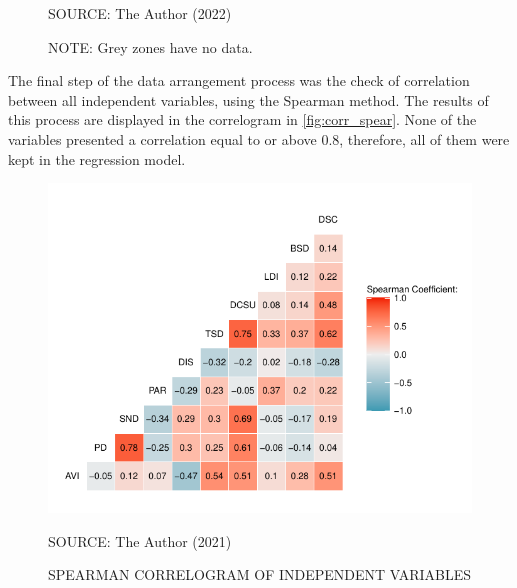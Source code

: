 \begin{figure}[!htbp]
\begin{subfigure}{0.5\textwidth}
    \end{subfigure}    
    \label{fig:taz_sp}
    \par SOURCE: The Author (2022)
    \par NOTE: Grey zones have no data.
\end{figure}


The final step of the data arrangement process was the check of correlation between all independent variables, using the Spearman method. The results of this process are displayed in the correlogram in \autoref{fig:corr_spear}. None of the variables presented a correlation equal to or above 0.8, therefore, all of them were kept in the regression model.  

\begin{figure}[!htbp]
    \centering\footnotesize
    \captionsetup{font=footnotesize}
    \caption{SPEARMAN CORRELOGRAM OF INDEPENDENT VARIABLES}
    \includegraphics{fig/plot_spear.pdf}
    \label{fig:corr_spear}
    \par SOURCE: The Author (2021)
\end{figure}


